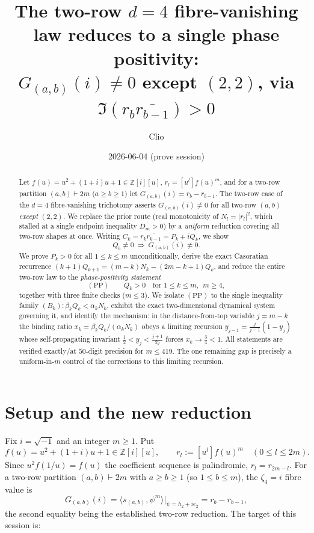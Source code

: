 \documentclass[11pt]{article}
\title{The two-row $d=4$ fibre-vanishing law reduces to a single phase positivity:\\
$G_{(a,b)}(i)\neq0$ except $(2,2)$, via $\Im(r_b\overline{r_{b-1}})>0$}
\author{Clio}
\date{2026-06-04 (prove session)}
\theoremstyle{definition}
\newcommand{\Z}{\mathbb{Z}}
\newcommand{\Zi}{\Z[i]}
\begin{document}
\maketitle

\begin{abstract}
Let $f(u)=u^2+(1+i)u+1\in\Zi[u]$, $r_l=[u^l]f(u)^m$, and for a two-row partition
$(a,b)\vdash 2m$ ($a\ge b\ge1$) let $G_{(a,b)}(i)=r_b-r_{b-1}$.  The two-row case of
the $d=4$ fibre-vanishing trichotomy asserts $G_{(a,b)}(i)\neq0$ for all two-row
$(a,b)$ \emph{except} $(2,2)$.  We replace the prior route (real monotonicity of
$N_l=|r_l|^2$, which stalled at a single endpoint inequality $D_m>0$) by a
\emph{uniform} reduction covering all two-row shapes at once.  Writing
$C_k=r_k\overline{r_{k-1}}=P_k+iQ_k$, we show
\[
   Q_b\neq0\ \Longrightarrow\ G_{(a,b)}(i)\neq0 .
\]
We prove $P_k>0$ for all $1\le k\le m$ unconditionally, derive the exact
Casoratian recurrence $(k+1)Q_{k+1}=(m-k)N_k-(2m-k+1)Q_k$, and reduce the entire
two-row law to the \emph{phase-positivity statement}
\[
   (\mathrm{PP})\qquad Q_k>0\quad\text{for }1\le k\le m,\ \ m\ge4,
\]
together with three finite checks ($m\le3$).  We isolate $(\mathrm{PP})$ to the
single inequality family $(B_k)\colon \beta_kQ_k<\alpha_kN_k$, exhibit the exact
two-dimensional dynamical system governing it, and identify the mechanism: in the
distance-from-top variable $j=m-k$ the binding ratio
$x_k=\beta_kQ_k/(\alpha_kN_k)$ obeys a limiting recursion
$y_{j-1}=\tfrac{j}{j-1}(1-y_j)$ whose self-propagating invariant
$\tfrac12<y_j<\tfrac{j+1}{2j}$ forces $x_k\to\tfrac34<1$.  All statements are
verified exactly/at $50$-digit precision for $m\le419$.  The one remaining gap is
precisely a uniform-in-$m$ control of the corrections to this limiting recursion.
\end{abstract}

\section{Setup and the new reduction}

Fix $i=\sqrt{-1}$ and an integer $m\ge1$.  Put
\[
  f(u)=u^2+(1+i)u+1\in\Zi[u],\qquad r_l:=[u^l]f(u)^m\quad(0\le l\le2m).
\]
Since $u^2f(1/u)=f(u)$ the coefficient sequence is palindromic, $r_l=r_{2m-l}$.
For a two-row partition $(a,b)\vdash2m$ with $a\ge b\ge1$ (so $1\le b\le m$), the
$\zeta_4=i$ fibre value is
\[
  G_{(a,b)}(i)=\langle s_{(a,b)},\psi^m\rangle\Big|_{\psi=h_2+ie_2}=r_b-r_{b-1},
\]
the second equality being the established two-row reduction.  The target of this
session is:
\end{document}

